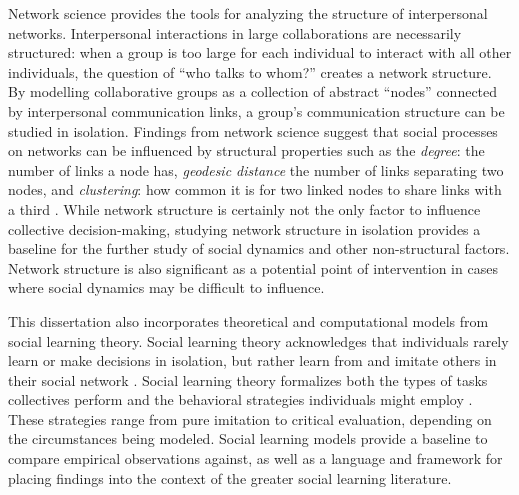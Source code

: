 Network science provides the tools for analyzing the structure of interpersonal
networks.
Interpersonal interactions in large collaborations are necessarily structured:
when a group is too large for each individual to interact with all other individuals,
the question of ``who talks to whom?'' creates a network structure.
By modelling collaborative groups as a collection of abstract ``nodes''
connected by interpersonal communication links,
a group's communication structure can be studied in isolation.
Findings from network science suggest that social processes on networks can be
influenced by structural properties such as
the {\em degree}: the number of links a node has,
{\em geodesic distance} the number of links separating two nodes,
and {\em clustering}: how common it is for two linked nodes to share links with
a third \cite{boccaletti_complex_2006}.
While network structure is certainly not the only factor to influence collective
decision-making,
studying network structure in isolation provides a baseline for the
further study of social dynamics and other non-structural factors.
Network structure is also significant as a potential point of intervention in
cases where social dynamics may be difficult to influence.

This dissertation also incorporates theoretical and computational models from
social learning theory.
Social learning theory acknowledges that individuals rarely
learn or make decisions in isolation, but rather learn from and imitate others
in their social network
\cite{golub_naive_2010}.
Social learning theory
formalizes both the types of tasks collectives perform
\cite{hong_interpreted_2009}
and the behavioral strategies individuals might employ
\cite{lazer_network_2007, barkoczi_social_2016}.
These strategies range from pure imitation to critical evaluation,
depending on the circumstances being modeled.
Social learning models provide a baseline to compare empirical observations
against,
as well as a language and framework for placing findings into the context of the greater social learning literature.

